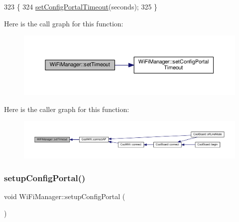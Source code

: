 \begin{DoxyCode}
323                                                   \{
324   \hyperlink{class_wi_fi_manager_a904006cb4d2c769e93bfdef336853766}{setConfigPortalTimeout}(seconds);
325 \}
\end{DoxyCode}
Here is the call graph for this function\+:
\nopagebreak
\begin{figure}[H]
\begin{center}
\leavevmode
\includegraphics[width=350pt]{d4/dc8/class_wi_fi_manager_aa6493d59c284ff245edb767ff684756d_cgraph}
\end{center}
\end{figure}
Here is the caller graph for this function\+:
\nopagebreak
\begin{figure}[H]
\begin{center}
\leavevmode
\includegraphics[width=350pt]{d4/dc8/class_wi_fi_manager_aa6493d59c284ff245edb767ff684756d_icgraph}
\end{center}
\end{figure}
\mbox{\label{class_wi_fi_manager_a1743325d0dd86d011df96b22d2a0ddd6}} 
\subsubsection{\texorpdfstring{setup\+Config\+Portal()}{setupConfigPortal()}}
{\footnotesize\ttfamily void Wi\+Fi\+Manager\+::setup\+Config\+Portal (\begin{DoxyParamCaption}{ }\end{DoxyParamCaption})\hspace{0.3cm}{\ttfamily [private]}}



